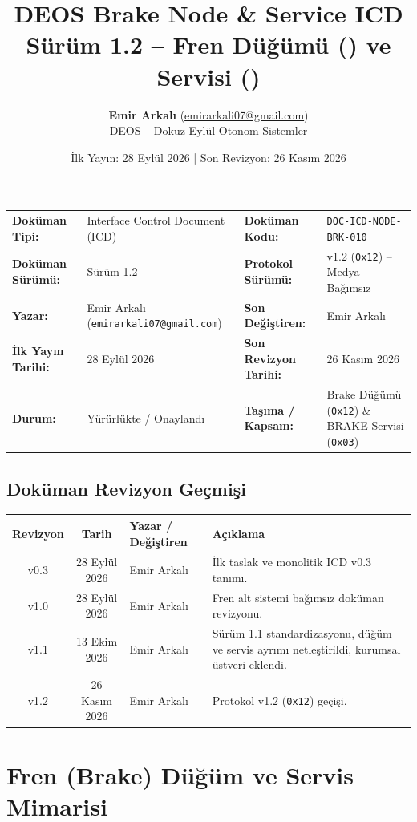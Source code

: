 \documentclass[a4paper,10pt]{article}
\title{\textbf{DEOS Brake Node \& Service ICD}\\
\large Sürüm 1.2 -- Fren Düğümü (\hex{12}) ve Servisi (\hex{03})}
\author{\textbf{Emir Arkalı} (\href{mailto:emirarkali07@gmail.com}{emirarkali07@gmail.com})\\DEOS -- Dokuz Eylül Otonom Sistemler}
\date{İlk Yayın: 28 Eylül 2026 \quad | \quad Son Revizyon: 26 Kasım 2026}
\newcommand{\hex}[1]{\texttt{0x#1}}
\newcommand{\code}[1]{\texttt{#1}}
\begin{document}
\maketitle

\begin{center}
\small
\begin{tabularx}{\textwidth}{ll lX}
\toprule
\textbf{Doküman Tipi:} & Interface Control Document (ICD) & \textbf{Doküman Kodu:} & \code{DOC-ICD-NODE-BRK-010} \\
\textbf{Doküman Sürümü:} & Sürüm 1.2 & \textbf{Protokol Sürümü:} & v1.2 (\hex{12}) -- Medya Bağımsız \\
\textbf{Yazar:} & Emir Arkalı (\texttt{emirarkali07@gmail.com}) & \textbf{Son Değiştiren:} & Emir Arkalı \\
\textbf{İlk Yayın Tarihi:} & 28 Eylül 2026 & \textbf{Son Revizyon Tarihi:} & 26 Kasım 2026 \\
\textbf{Durum:} & Yürürlükte / Onaylandı & \textbf{Taşıma / Kapsam:} & Brake Düğümü (\hex{12}) \& BRAKE Servisi (\hex{03}) \\
\bottomrule
\end{tabularx}
\end{center}

\subsection*{Doküman Revizyon Geçmişi}
\begin{center}
\small
\begin{tabularx}{\textwidth}{c c l X}
\toprule
\textbf{Revizyon} & \textbf{Tarih} & \textbf{Yazar / Değiştiren} & \textbf{Açıklama} \\
\midrule
v0.3 & 28 Eylül 2026 & Emir Arkalı & İlk taslak ve monolitik ICD v0.3 tanımı. \\
v1.0 & 28 Eylül 2026 & Emir Arkalı & Fren alt sistemi bağımsız doküman revizyonu. \\
v1.1 & 13 Ekim 2026 & Emir Arkalı & Sürüm 1.1 standardizasyonu, düğüm ve servis ayrımı netleştirildi, kurumsal üstveri eklendi. \\
v1.2 & 26 Kasım 2026 & Emir Arkalı & Protokol v1.2 (\hex{12}) geçişi. \\
\bottomrule
\end{tabularx}
\end{center}
\vspace{0.8em}

\section{Fren (Brake) Düğüm ve Servis Mimarisi}
\end{document}

